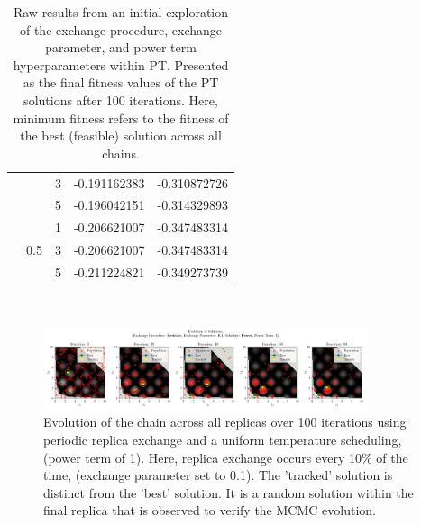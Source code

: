 \documentclass[10pt]{article}
\begin{document}
\begin{table}[H]
\begin{tabular}{|*{5}{c|}}
        & & 3\cellcolor{lightgray} & -0.191162383\cellcolor{lightgray} & -0.310872726\cellcolor{lightgray} \\
        & & 5\cellcolor{gray} & -0.196042151\cellcolor{gray} & -0.314329893\cellcolor{gray} \\
        \cline{2-5}
        & \multirow{3}{*}{0.5} & 1 & -0.206621007 & -0.347483314 \\
        & & 3\cellcolor{lightgray} & -0.206621007\cellcolor{lightgray} & -0.347483314\cellcolor{lightgray} \\
        & & 5\cellcolor{gray} & -0.211224821\cellcolor{gray} & -0.349273739\cellcolor{gray} \\
        \hline
    \end{tabular}\
    \captionsetup{justification=centering}
    \caption{Raw results from an initial exploration of the exchange procedure, exchange parameter, and power term hyperparameters within PT. Presented as the final fitness values of the PT solutions after 100 iterations. Here, minimum fitness refers to the fitness of the best (feasible) solution across all chains.}
    \label{tab:exchange_results}
\end{table}

\begin{figure}[H]
    \centering
    \includegraphics[width=0.85\textwidth]{../figures/KBF/100_iters/Periodic/Power/0.1_1_Solutions.png}
    \captionsetup{justification=centering}
    \caption{Evolution of the chain across all replicas over 100 iterations using periodic replica exchange and a uniform temperature scheduling, (power term of 1). Here, replica exchange occurs every 10\% of the time, (exchange parameter set to 0.1). The 'tracked' solution is distinct from the 'best' solution. It is a random solution within the final replica that is observed to verify the MCMC evolution.}
    \label{fig:PeriodicApp}
\end{figure}
\end{document}
